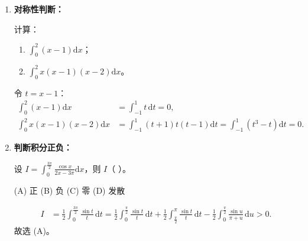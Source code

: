 \begin{enumerate}
          \begin{enumerate}
              \item \textbf{对称性判断：}
                    \begin{example}{}{}
                        计算：
                        \begin{enumerate}
                            \item $\displaystyle \int_{0}^{2}(x-1)\mathrm{d}x$；
                            \item $\displaystyle \int_{0}^{2}x(x-1)(x-2)\mathrm{d}x$。
                        \end{enumerate}
                    \end{example}
                    \begin{solution}
                        令 $t=x-1$：
                        \begin{align*}
                            \int_{0}^{2}(x-1)\mathrm{d}x       & = \int_{-1}^{1}t\,\mathrm{d}t = 0,                                       \\
                            \int_{0}^{2}x(x-1)(x-2)\mathrm{d}x & = \int_{-1}^{1}(t+1)t(t-1)\mathrm{d}t=\int_{-1}^{1}(t^3-t)\mathrm{d}t=0.
                        \end{align*}
                    \end{solution}

              \item \textbf{判断积分正负：}
                    \begin{example}{}{}
                        设 $I=\displaystyle\int_{0}^{\frac{3\pi}{2}}\frac{\cos x}{2x-3\pi}\mathrm{d}x$，则 $I$（  ）。
                        \begin{center}
                            (A) 正 \quad (B) 负 \quad (C) 零 \quad (D) 发散
                        \end{center}
                    \end{example}
                    \begin{solution}
                        \vspace{-0.5em}
                        \begin{align*}
                            I & = \tfrac{1}{2}\int_{0}^{\frac{3\pi}{2}}\frac{\sin t}{t}\,\mathrm{d}t
                            = \tfrac{1}{2}\int_{0}^{\frac{\pi}{2}}\!\!\!\frac{\sin t}{t}\,\mathrm{d}t
                            + \tfrac{1}{2}\int_{\frac{\pi}{2}}^{\pi}\!\!\!\frac{\sin t}{t}\,\mathrm{d}t
                            - \tfrac{1}{2}\int_{0}^{\frac{\pi}{2}}\!\!\!\frac{\sin u}{\pi+u}\,\mathrm{d}u > 0.
                        \end{align*}
                        故选 (A)。
                    \end{solution}


\end{enumerate}
\end{enumerate}
